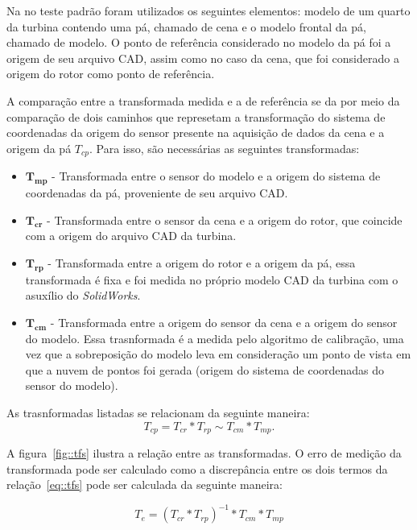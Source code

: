 Na no teste padrão foram utilizados os seguintes elementos: modelo de um quarto
da turbina contendo uma pá, chamado de cena e o modelo frontal da pá, chamado de
modelo. O ponto de referência considerado no modelo da pá foi a origem de seu
arquivo CAD, assim como no caso da cena, que foi considerado a origem do rotor
como ponto de referência.

A comparação entre a transformada medida e a de referência se da por meio da
comparação de dois caminhos que represetam a transformação do sistema de
coordenadas da origem do sensor presente na aquisição de dados da cena e a
origem da pá $T_{cp}$.  Para isso, são necessárias as seguintes transformadas:

\begin{itemize}
  \item $\mathbf{T_{mp}}$ - Transformada entre o sensor do modelo e a
  origem do sistema de coordenadas da pá, proveniente de seu arquivo CAD.
  \item $\mathbf{T_{cr}}$ - Transformada entre o sensor da cena e a origem do
  rotor, que coincide com a origem do arquivo CAD da turbina.
  \item $\mathbf{T_{rp}}$ - Transformada entre a origem do rotor e a origem da
  pá, essa transformada é fixa e foi medida no próprio modelo CAD da turbina com
  o asuxílio do \textit{SolidWorks}.
  \item $\mathbf{T_{cm}}$ - Transformada entre a origem do sensor da cena e a
  origem do sensor do modelo. Essa trasnformada é a medida pelo algoritmo de
  calibração, uma vez que a sobreposição do modelo leva em consideração um ponto
  de vista em que a nuvem de pontos foi gerada (origem do sistema de
  coordenadas do sensor do modelo).
\end{itemize}

As trasnformadas listadas se relacionam da seguinte maneira:
\begin{equation}
T_{cp} = T_{cr}*T_{rp} \sim T_{cm}*T_{mp}.
\label{eq::tfs}
\end{equation}


A figura~\ref{fig::tfs} ilustra a relação entre as transformadas. O erro de
medição da transformada pode ser calculado como a discrepância entre os dois
termos da relação~\ref{eq::tfs} pode ser calculada da seguinte maneira:

$$T_e = (T_{cr}*T_{rp})^{-1}*T_{cm}*T_{mp}$$


